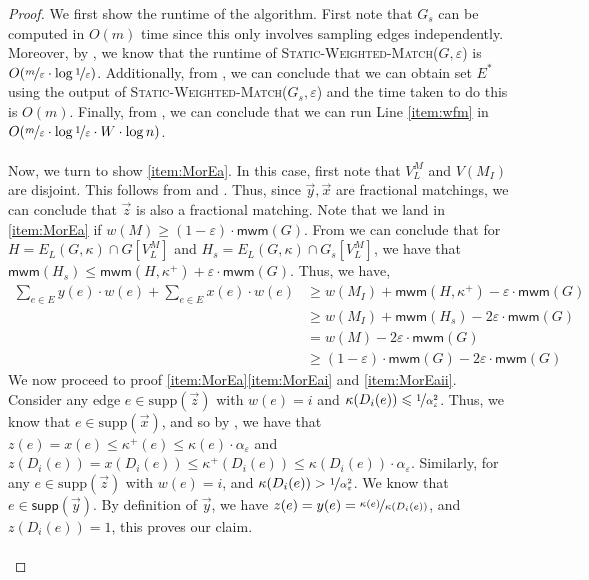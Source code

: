 \documentclass[a4paper,11pt]{article}
\newcommand{\eps}{\varepsilon}
\theoremstyle{definition}
\theoremstyle{definition}
\theoremstyle{definition}
\theoremstyle{definition}
\theoremstyle{definition}
\theoremstyle{definition}
\theoremstyle{definition}
\theoremstyle{definition}
\theoremstyle{definition}
\theoremstyle{definition}
\theoremstyle{definition}
\theoremstyle{definition}
\theoremstyle{definition}
\theoremstyle{definition}
\theoremstyle{definition}
\begin{document}
\begin{proof}
We first show the runtime of the algorithm. First note that $G_s$ can be computed in $O(m)$ time since this only involves sampling edges independently. Moreover, by , we know that the runtime of \textsc{Static-Weighted-Match}($G,\eps$) is $O(\nicefrac{m}{\eps}\cdot \log \nicefrac{1}{\eps})$. Additionally, from , we can conclude that we can obtain set $E^*$ using the output of \textsc{Static-Weighted-Match}($G_s,\eps$) and the time taken to do this is $O(m)$. Finally, from , we can conclude that we can run Line \ref{item:wfm} in $O(\nicefrac{m}{\eps}\cdot \log\nicefrac{1}{\eps}\cdot W\cdot \log n)$. \\ \\
Now, we turn to show \ref{item:MorEa}. In this case, first note that $V_{L}^M$ and $V(M_I)$ are disjoint. This follows from  and . Thus, since $\vec{y}, \vec{x}$ are fractional matchings, we can conclude that $\vec{z}$ is also a fractional matching.  Note that we land in \ref{item:MorEa} if $w(M)\geqslant (1-\eps)\cdot \textsf{mwm}(G)$. From  we can conclude that for $H=E_{L}(G,\kappa)\cap G[V_{L}^M]$ and $H_s=E_{L}(G,\kappa)\cap G_s[V_{L}^M]$, we have that  $\textsf{mwm}(H_s)\leqslant \textsf{mwm}(H,\kappa^+)+\eps\cdot \textsf{mwm}(G) $. Thus, we have,
\begin{align*}
\sum_{e\in E}y(e)\cdot w(e)+\sum_{e\in E} x(e)\cdot w(e)&\geqslant w(M_I)+ \textsf{mwm}(H,\kappa^+)-\eps\cdot \textsf{mwm}(G)\\
&\geqslant w(M_I)+ \textsf{mwm}(H_s)-2\eps\cdot \textsf{mwm}(G)\\
&=w(M)-2\eps\cdot \textsf{mwm}(G)\\
&\geqslant(1-\eps)\cdot \textsf{mwm}(G)-2\eps\cdot \textsf{mwm}(G)
\end{align*}
We now proceed to proof \ref{item:MorEa}\ref{item:MorEai} and \ref{item:MorEaii}. Consider any edge $e\in \text{supp}(\vec{z})$ with $w(e)=i$ and $\kappa(D_{i}(e))\leqslant \nicefrac{1}{\alpha_{\eps}^2}$.  Thus, we know that $e\in \text{supp}(\vec{x})$, and so by , we have that $z(e)=x(e)\leqslant \kappa^{+}(e)\leqslant \kappa(e)\cdot \alpha_{\eps}$ and $z(D_i(e))=x(D_i(e))\leqslant \kappa^{+}(D_i(e))\leqslant \kappa(D_{i}(e))\cdot \alpha_{\eps}$. Similarly, for any $e\in \text{supp}(\vec{z})$ with  $w(e)=i$, and $\kappa(D_i(e))>\nicefrac{1}{\alpha_{\eps}^2}$. We know that $e\in \textsf{supp}(\vec{y})$. By definition of $\vec{y}$, we have $z(e)=y(e)=\nicefrac{\kappa(e)}{\kappa(D_i(e))}$, and $z(D_i(e))=1$, this proves our claim.\\ \\

\end{proof}
\end{document}
